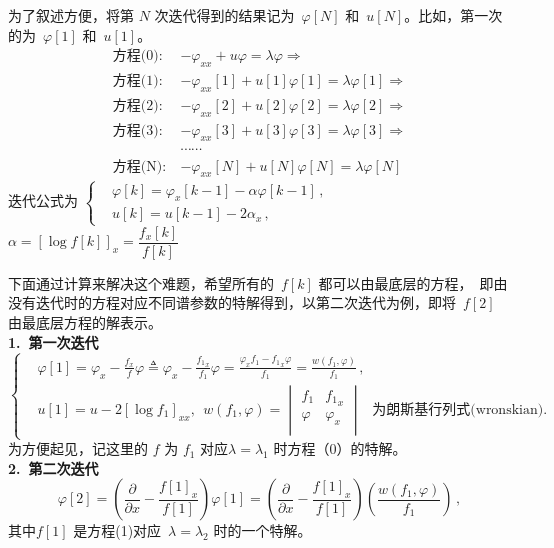 为了叙述方便，将第 $N$ 次迭代得到的结果记为\ $\varphi[N]$ 和\ $u[N]$。比如，第一次的为\ $\varphi[1]$ 和\ $u[1]$。
\begin{align*}
\text{方程(0)}:\ &- \varphi_{xx} + u \varphi = \lambda \varphi  \Rightarrow \\
\text{方程(1)}:\ &- \varphi_{xx}[1] + u[1] \varphi[1] = \lambda \varphi[1] \Rightarrow \\
\text{方程(2)}:\ &- \varphi_{xx}[2] + u[2] \varphi[2] = \lambda \varphi[2] \Rightarrow \\
\text{方程(3)}:\ &- \varphi_{xx}[3] + u[3] \varphi[3] = \lambda \varphi[3] \Rightarrow \\
& \cdots\cdots  \\
\text{方程(N)}:\ &- \varphi_{xx}[N] + u[N] \varphi[N] = \lambda \varphi[N]
\end{align*}
迭代公式为
$\left\{
\begin{aligned}
&\varphi[k]  =  \varphi_x[k - 1] - \alpha \varphi[k - 1]\,, \\
&u[k]   =  u[k - 1] - 2 \alpha_x\,,
\end{aligned}
\right.$
\  $\alpha = [\log f[k]]_x = \dfrac{f_x[k]}{f[k]}$   %

\vspace{2mm}
下面通过计算来解决这个难题，希望所有的\ $f[k]$ 都可以由最底层的方程，\ 即由没有迭代时的方程对应不同谱参数的特解得到，以第二次迭代为例，即将\ $f[2]$ 由最底层方程的解表示。\\
\textbf{1.\ 第一次迭代}
\begin{equation}
\left\{
\begin{aligned}
&\varphi[1] = \varphi_x - \frac{f_x}{f} \varphi \triangleq \varphi_x - \frac{{f_1}_x}{f_1}\varphi = \frac{\varphi_x f_1 - {f_1}_x \varphi}{f_1} = \frac{w(f_1, \varphi)}{f_1}\,, \\
&u[1] = u - 2 [\log f_1]_{xx},  \ \ w(f_1, \varphi) =
\begin{vmatrix}
f_1 & {f_1}_x \\
\varphi & \varphi_x \\
\end{vmatrix} \ \;\; \text{为朗斯基行列式(wronskian)}.
\end{aligned}
\right. 
\end{equation} \label{1.7}
为方便起见，记这里的 $f$ 为 $f_1$ 对应$\lambda = \lambda_1$ 时方程（0）的特解。\\
\textbf{2.\ 第二次迭代}
\begin{equation*}
\varphi[2] = (\frac{\partial}{\partial x} - \frac{f[1]_x}{f[1]})\varphi[1]=(\frac{\partial}{\partial x} - \frac{f[1]_x}{f[1]}) (\frac{w(f_1, \varphi)}{f_1})\,,
\end{equation*}
其中$f[1]$ 是方程(1)对应\ $\lambda = \lambda_2$ 时的一个特解。\\

